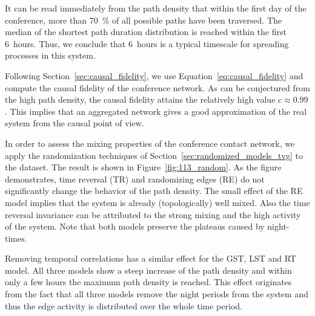 It can be read immediately from the path density that within the first day of the conference, more than 70~\% of all possible paths have been traversed.
The median of the shortest path duration distribution is reached within the first 6~hours.
Thus, we conclude that 6~hours is a typical timescale for spreading processes in this system.

Following Section~\ref{sec:causal_fidelity}, we use Equation~\eqref{eq:causal_fidelity} and compute the causal fidelity of the conference network.
As can be conjectured from the high path density, the causal fidelity attains the relatively high value $c\approx 0.99$.
This implies that an aggregated network gives a good approximation of the real system from the causal point of view.

In order to assess the mixing properties of the conference contact network, we apply the randomization techniques of Section~\ref{sec:randomized_models_tvg} to the dataset.
The result is shown in Figure~\ref{fig:113_random}.
As the figure demonstrates, time reversal (TR) and randomizing edges (RE) do not significantly change the behavior of the path density.
The small effect of the RE model implies that the system is already (topologically) well mixed.
Also the time reversal invariance can be attributed to the strong mixing and the high activity of the system.
Note that both models preserve the plateaus caused by night-times.

Removing temporal correlations has a similar effect for the GST, LST and RT model.
All three models show a steep increase of the path density and within only a few hours the maximum path density is reached.
This effect originates from the fact that all three models remove the night periods from the system and thus the edge activity is distributed over the whole time period.

